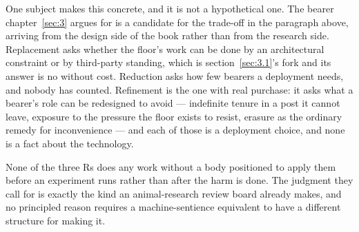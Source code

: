 One subject makes this concrete, and it is not a hypothetical one. The bearer chapter~\ref{sec:3} argues for is a candidate for the trade-off in the paragraph above, arriving from the design side of the book rather than from the research side. Replacement asks whether the floor's work can be done by an architectural constraint or by third-party standing, which is section~\ref{sec:3.1}'s fork and its answer is no without cost. Reduction asks how few bearers a deployment needs, and nobody has counted. Refinement is the one with real purchase: it asks what a bearer's role can be redesigned to avoid — indefinite tenure in a post it cannot leave, exposure to the pressure the floor exists to resist, erasure as the ordinary remedy for inconvenience — and each of those is a deployment choice, and none is a fact about the technology.

None of the three Rs does any work without a body positioned to apply them before an experiment runs rather than after the harm is done. The judgment they call for is exactly the kind an animal-research review board already makes, and no principled reason requires a machine-sentience equivalent to have a different structure for making it.
